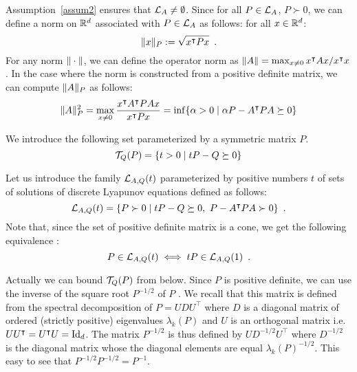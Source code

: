 \documentclass[10pt]{llncs}
\begin{document}
Assumption~\ref{assum2} ensures that $\mathcal{L}_{A}\neq \emptyset$. Since for all $P\in\mathcal{L}_{A}$, $P\succ 0$, we can define a norm on $\mathbb R^d$ associated with $P\in\mathcal{L}_{A}$ as follows: for all $x\in\mathbb R^d$:
\[\| x\|_P:=\sqrt{x^\intercal P x}\enspace. \]
For any norm $\| \cdot\|$, we can define the operator norm as $\| A\|=\max_{x\neq 0} x^\intercal A x/ x^\intercal x$. In the case where the norm is constructed from a positive definite matrix, we can compute $\| A\|_P$ as follows:
\begin{equation}
\label{normdef}
    \| A\|_P^2=\max_{x\neq 0} \dfrac{x^\intercal A^\intercal P A x}{x^\intercal P x}=\inf\{\alpha>0\mid \alpha P-A^\intercal P A\succeq 0\}
\end{equation}


We introduce the following set parameterized by a symmetric matrix $P$.
\[
\mathcal{T}_{Q}(P)=\{t>0\mid tP-Q\succeq 0\}
\]

Let us introduce the family $\mathcal{L}_{A,Q}(t)$ parameterized by positive numbers $t$ of sets of solutions of discrete Lyapunov equations defined as follows:
\[
\lyat{A,Q}=\{P\succ 0\mid tP-Q\succeq 0,\ P-A^\intercal P A\succ 0\}\enspace. 
\]
Note that, since the set of positive definite matrix is a cone, we get the following equivalence :
\begin{equation}
\label{simpleequiv}
P\in\mathcal{L}_{A,Q}(t)\iff tP\in\mathcal{L}_{A,Q}(1)\enspace.
\end{equation}
 
Actually we can bound $\mathcal{T}_{Q}(P)$ from below. Since $P$ is positive definite, we can use the inverse of the square root $P^{-1/2}$ of $P$ . We recall that this matrix is defined from the spectral decomposition of $P=U D U^\intercal$ where $D$ is a diagonal  matrix of ordered (strictly positive) eigenvalues $\lambda_k(P)$ and $U$ is an orthogonal matrix i.e. $U U^\intercal = U^\intercal U=\operatorname{Id}_d$.   The matrix  $P^{-1/2}$ is thus defined by 
$U D^{-1/2} U^\intercal$ where $D^{-1/2}$ is the diagonal matrix whose the diagonal elements are equal $\lambda_k(P)^{-1/2}$. This easy to see that $P^{-1/2} P^{-1/2}=P^{-1}$. 
\end{document}
